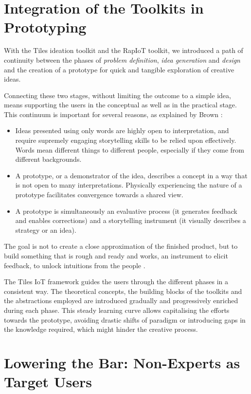 \section{Integration of the Toolkits in Prototyping}

With the Tiles ideation toolkit and the RapIoT toolkit, we introduced a path of continuity between the phases of \textit{problem definition}, \textit{idea generation} and \textit{design} and the creation of a prototype for quick and tangible exploration of creative ideas.

Connecting these two stages, without limiting the outcome to a simple idea, means supporting the users in the conceptual as well as in the practical stage. This continuum is important for several reasons, as explained by Brown \autocite*{brown_strategy_2005}:

\begin{itemize}
    \item Ideas presented using only words are highly open to interpretation, and require supremely engaging storytelling skills to be relied upon effectively. Words mean different things to different people, especially if they come from different backgrounds.
    \item A prototype, or a demonstrator of the idea, describes a concept in a way that is not open to many interpretations. Physically experiencing the nature of a prototype facilitates convergence towards a shared view.
    \item A prototype is simultaneously an evaluative process (it generates feedback and enables corrections) and a storytelling instrument (it visually describes a strategy or an idea).
\end{itemize}

The goal is not to create a close approximation of the finished product, but to build something that is rough and ready and works, an instrument to elicit feedback, to unlock intuitions from the people \autocite{brown_strategy_2005}.

The Tiles IoT framework guides the users through the different phases in a consistent way. The theoretical concepts, the building blocks of the toolkits and the abstractions employed are introduced gradually and progressively enriched during each phase. This steady learning curve allows capitalising the efforts towards the prototype, avoiding drastic shifts of paradigm or introducing gaps in the knowledge required, which might hinder the creative process.


\section{Lowering the Bar: Non-Experts as Target Users}

